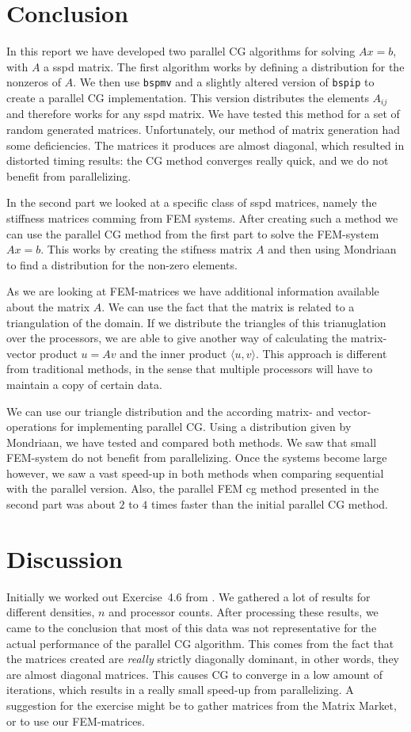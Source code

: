 \documentclass[11pt]{amsart}
\theoremstyle{definition}
\begin{document}
\section{Conclusion}
In this report we have developed two parallel CG algorithms for solving $Ax =b$, with $A$ a sspd matrix. The first algorithm works by defining a distribution for the nonzeros of $A$. We then use \verb=bspmv= and a slightly altered version of \verb=bspip= to create a parallel CG implementation. This version distributes the elements $A_{ij}$ and therefore works for any sspd matrix.
We have tested this method for a set of random generated matrices. Unfortunately, our method of matrix generation had some deficiencies. The matrices it produces are almost diagonal, which resulted in distorted timing results: the CG method converges really quick, and we do not benefit from parallelizing.

In the second part we looked at a specific class of sspd matrices, namely the stiffness matrices comming from FEM systems. After creating such a method we can use the parallel CG method from the first part to solve the FEM-system $Ax = b$. This works by creating the stifness matrix $A$ and then using Mondriaan to find a distribution for the non-zero elements.

As we are looking at FEM-matrices we have additional information available about the matrix $A$. We can use the fact that the matrix is related to a triangulation of the domain. If we distribute the triangles of this trianuglation over the processors, we are able to give another way of calculating the matrix-vector product $u = Av$ and the inner product $\langle u, v \rangle$.  This approach  is different from traditional methods, in the sense that multiple processors will have to maintain a copy of certain data. 

We can use our triangle distribution and the according matrix- and vector-operations for implementing parallel CG. Using a distribution given by Mondriaan, we have tested and compared both methods. We saw that small FEM-system do not benefit from parallelizing. Once the systems become large however, we saw a vast speed-up in both methods when comparing sequential with the parallel version. Also, the parallel FEM cg method presented in the second part was about $2$ to $4$ times faster than the initial parallel CG method.

\section{Discussion}
Initially we worked out Exercise~4.6 from \cite{biss04}. We gathered a lot of results for different densities, $n$ and processor counts. After processing these results, we came to the conclusion that most of this data was not representative for the actual performance of the parallel CG algorithm. This comes from the fact that the matrices created are \emph{really} strictly diagonally dominant, in other words, they are almost diagonal matrices. This causes CG to converge in a low amount of iterations, which results in a really small speed-up from parallelizing.
A suggestion for the exercise might be to gather matrices from the Matrix Market, or to use our FEM-matrices.
\end{document}
